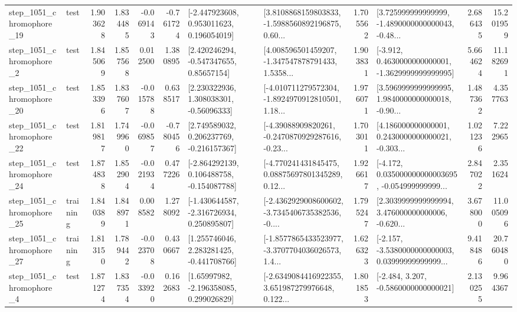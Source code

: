 \begin{tabular}{llrrrrllrlrr}
 step\_1051\_chromophore\_19 &      test &      1.903628 &    1.834485 &     -0.069143 & -0.761724 &    [-2.447923608, 0.953011623, 0.196054019] &  [3.8108868159803833, -1.5988560892196875, 0.60... &       1.705562 &  [3.725999999999999, -1.4890000000000043, -0.48... &            2.686435 &         15.201959 \\
  step\_1051\_chromophore\_2 &      test &      1.845069 &    1.857568 &      0.012500 &  1.380895 &     [2.420246294, -0.547347655, 0.85657154] &  [4.008596501459207, -1.347547878791433, 1.5358... &       1.903831 &  [-3.912, 0.4630000000000001, -1.3629999999999995] &            5.664624 &         11.182691 \\
 step\_1051\_chromophore\_20 &      test &      1.853396 &    1.837607 &     -0.015788 &  0.638517 &     [2.230322936, 1.308038301, -0.56096333] &  [-4.010711279572304, -1.8924970912810501, 1.18... &       1.976071 &  [3.5969999999999995, 1.9840000000000018, -0.90... &            1.487362 &          4.357763 \\
 step\_1051\_chromophore\_22 &      test &      1.819817 &    1.749960 &     -0.069857 & -0.780456 &    [2.749589032, 0.206237769, -0.216157367] &  [-4.39088909820261, -0.2470870929287616, -0.23... &       1.703011 &  [4.186000000000001, 0.2430000000000021, -0.303... &            1.021236 &          7.222965 \\
 step\_1051\_chromophore\_24 &      test &      1.874838 &    1.852904 &     -0.021934 &  0.477226 &   [-2.864292139, 0.106488758, -0.154087788] &  [-4.770241431845475, 0.08875697801345289, 0.12... &       1.926617 &  [-4.172, 0.035000000000003695, -0.054999999999... &            2.847022 &          2.351624 \\
 step\_1051\_chromophore\_25 &  training &      1.840389 &    1.848971 &      0.008582 &  1.278092 &   [-1.430644587, -2.316726934, 0.250895807] &  [-2.4362929008600602, -3.7345406735382536, -0.... &       1.795247 &  [2.3039999999999994, 3.476000000000006, -0.620... &            3.678000 &         11.005096 \\
 step\_1051\_chromophore\_27 &  training &      1.813150 &    1.789442 &     -0.023708 &  0.430667 &    [1.255746046, 2.283281425, -0.441708766] &  [-1.8577865433523977, -3.3707704036026573, 1.4... &       1.626323 &  [-2.157, -3.5380000000000003, 0.03999999999999... &            9.418486 &         20.760480 \\
  step\_1051\_chromophore\_4 &      test &      1.871274 &    1.837354 &     -0.033920 &  0.162683 &     [1.65997982, -2.196358085, 0.299026829] &  [-2.6349084416922355, 3.651987279976648, 0.122... &       1.801853 &               [-2.484, 3.207, -0.5860000000000021] &            2.130255 &          9.964367 \\

\end{tabular}
